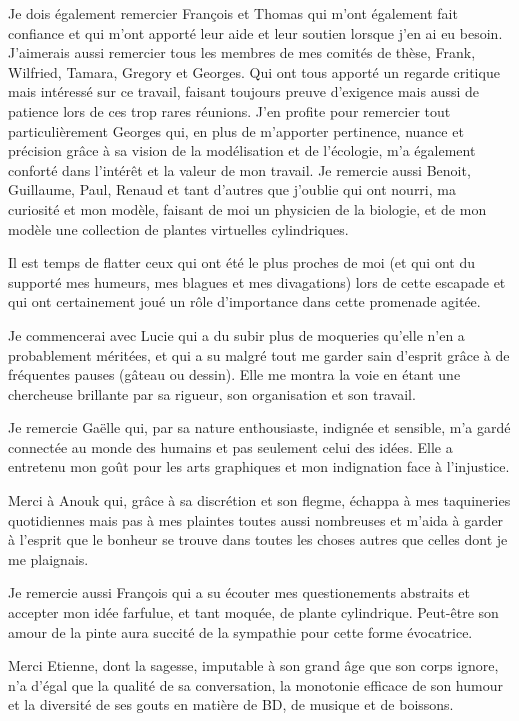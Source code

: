\documentclass[a4paper, notoc, justified,marginals=left, nobib]{tufte-book}
\begin{document}
\begin{fullwidth}
Je dois également remercier François et Thomas qui m'ont également fait confiance et qui m'ont apporté leur aide et leur soutien lorsque j'en ai eu besoin. J'aimerais aussi remercier tous les membres de mes comités de thèse, Frank, Wilfried, Tamara, Gregory et Georges. Qui ont tous apporté un regarde critique mais intéressé sur ce travail, faisant toujours preuve d'exigence mais aussi de patience lors de ces trop rares réunions. J'en profite pour remercier tout particulièrement Georges qui, en plus de m'apporter pertinence, nuance et précision grâce à sa vision de la modélisation et de l'écologie, m'a également conforté dans l'intérêt et la valeur de mon travail. Je remercie aussi Benoit, Guillaume, Paul, Renaud et tant d'autres que j'oublie qui ont nourri, ma curiosité et mon modèle, faisant de moi un physicien de la biologie, et de mon modèle une collection de plantes virtuelles cylindriques.

Il est temps de flatter ceux qui ont été le plus proches de moi (et qui ont du supporté mes humeurs, mes blagues et mes divagations) lors de cette escapade et qui ont certainement joué un rôle d'importance dans cette promenade agitée.

Je commencerai avec Lucie qui a du subir plus de moqueries qu'elle n'en a probablement méritées, et qui a su malgré tout me garder sain d'esprit grâce à de fréquentes pauses (gâteau ou dessin). Elle me montra la voie en étant une chercheuse brillante par sa rigueur, son organisation et son travail.

Je remercie Gaëlle qui, par sa nature enthousiaste, indignée et sensible, m'a gardé connectée au monde des humains et pas seulement celui des idées. Elle a entretenu mon goût pour les arts graphiques et mon indignation face à l'injustice.

Merci à Anouk qui, grâce à sa discrétion et son flegme, échappa à mes taquineries quotidiennes mais pas à mes plaintes toutes aussi nombreuses et m'aida à garder à l'esprit que le bonheur se trouve dans toutes les choses autres que celles dont je me plaignais.

Je remercie aussi François qui a su écouter mes questionements abstraits et accepter mon idée farfulue, et tant moquée, de plante cylindrique. Peut-être son amour de la pinte aura succité de la sympathie pour cette forme évocatrice.

Merci Etienne, dont la sagesse, imputable à son grand âge que son corps ignore, n'a d'égal que la qualité de sa conversation, la monotonie efficace de son humour et la diversité de ses gouts en matière de BD, de musique et de boissons.


\end{fullwidth}
\end{document}
